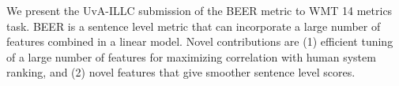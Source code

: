 We present the UvA-ILLC submission of the BEER metric to WMT 14 metrics task. BEER is a sentence level metric that can incorporate a large number of features combined in a linear model. Novel contributions are (1) efficient tuning of a large number of features for maximizing correlation with human system ranking, and (2) novel features that  give smoother sentence level scores.
